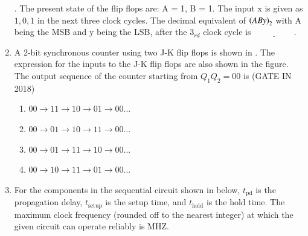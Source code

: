 \begin{enumerate}[label=\arabic*.,ref=\theenumi]
	.
 The present state of the flip flops are: A = 1, B = 1. The input x is given as $1, 0, 1$ in the next three clock cycles. The decimal equivalent of $\left(ABy\right)_{2}$ with A being the MSB and y being the LSB, after the $3_{rd}$ clock cycle is $\underline{\hspace{2cm}}$.
\hfill{}
	\begin{figure}[H]
    \centering
    \resizebox{0.75\columnwidth}{!}{%

	}
    \caption{}
	\label{fig:GATEIN2020-40}
\end{figure}
%
\item A 2-bit synchronous counter using two J-K flip flops is shown
in .
 The expression for the inputs to the J-K flip flops are also shown in the figure. The output sequence of the counter starting from $Q_{1}Q_{2} = 00$ is
\hfill (GATE IN 2018)
\begin{enumerate}
\item $00 \rightarrow 11 \rightarrow 10 \rightarrow 01 \rightarrow 00 \hdots $
\item $00 \rightarrow 01 \rightarrow 10 \rightarrow 11 \rightarrow 00 \hdots $
\item $00 \rightarrow 01 \rightarrow 11 \rightarrow 10 \rightarrow 00 \hdots $
\item $00 \rightarrow 10 \rightarrow 11 \rightarrow 01 \rightarrow 00 \hdots $
\end{enumerate}
%
\begin{figure}[H]
\centering
    \resizebox{\columnwidth}{!}{%

	}
	\caption{}
\label{fig:gate_in_2018_44}
\end{figure}
%
\item For the components in the sequential circuit shown 
	in 
	below, $t_{\text{pd}}$ is the propagation delay, $t_{\text{setup}}$ is the setup time, and $t_{\text{hold}}$ is the hold time. The maximum clock frequency (rounded off to the nearest integer) at which the given circuit can operate reliably is \underline{\hspace{1cm}}MHZ.
\hfill{}

	\begin{figure}[H]
    \centering
    \resizebox{0.75\columnwidth}{!}{%

	}
    \caption{}
	\label{fig:GATEEC2020-50}
\end{figure}


\end{enumerate}
